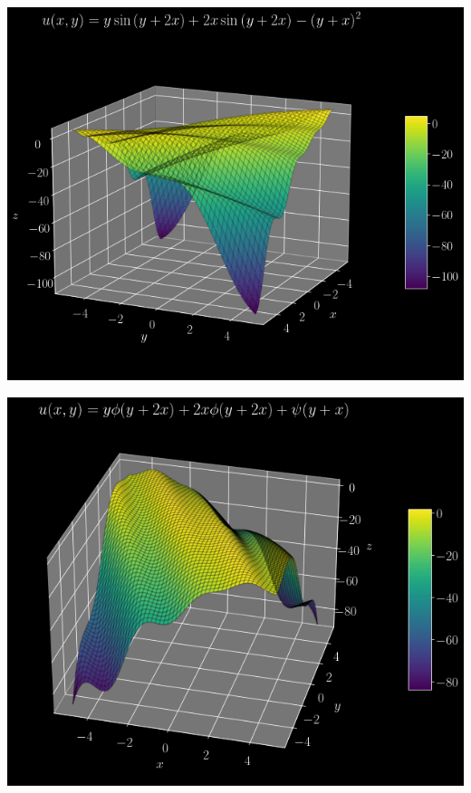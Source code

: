 \documentclass[10pt]{article}
\begin{document}
\begin{center}
    \begin{minipage}{0.49\linewidth}
        \includegraphics[width=\textwidth]{img/6_1.png}
    \end{minipage}
    \hfill
    \begin{minipage}{0.49\linewidth}
        \includegraphics[width=.96\textwidth]{img/6_2.png}
    \end{minipage}
\end{center}

\newpage
\end{document}
